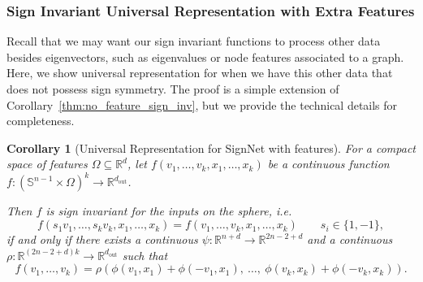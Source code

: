 \documentclass{article} \usepackage{iclr2023_conference,times}
\newcommand{\RR}{\mathbb R}
\renewcommand{\SS}{\mathbb S}
\newcommand{\mrm}[1]{\mathrm{#1}}
\newcommand{\dout}{d_{\mrm{out}}}
\newtheorem{corollary}{Corollary}
\begin{document}
\subsubsection{Sign Invariant Universal Representation with Extra Features}

Recall that we may want our sign invariant functions to process other data besides eigenvectors, such as eigenvalues or node features associated to a graph. Here, we show universal representation for when we have this other data that does not possess sign symmetry. The proof is a simple extension of Corollary~\ref{thm:no_feature_sign_inv}, but we provide the technical details for completeness.

\begin{corollary}[Universal Representation for SignNet with features]
    For a compact space of features $\Omega \subseteq \RR^d$, let $f(v_1, \ldots, v_k, x_1, \ldots, x_k)$ be a continuous function $f: (\SS^{n-1} \times \Omega)^k  \to \RR^{\dout}$.

    Then $f$ is sign invariant for the inputs on the sphere, i.e. 
    \begin{equation}
    f(s_1 v_1, \ldots, s_k v_k, x_1, \ldots, x_k) = f(v_1, \ldots, v_k, x_1, \ldots, x_k) \qquad s_i \in \{1, -1\},
\end{equation}
if and only if there exists a continuous $\psi: \RR^{n+d} \to \RR^{2n-2+d}$ and a continuous $\rho: \RR^{(2n-2+d)k} \to \RR^{\dout}$ such that
    \begin{equation}
        f(v_1, \ldots, v_k) = \rho\left(\phi(v_1, x_1) + \phi(-v_1, x_1), \  \ldots, \  \phi(v_k, x_k) + \phi(-v_k, x_k) \right).
    \end{equation}
\end{corollary}
\end{document}
